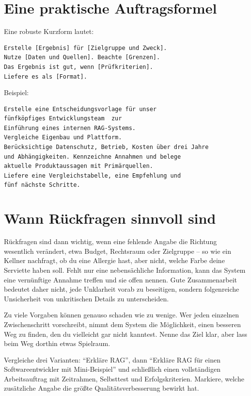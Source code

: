 \section{Eine praktische Auftragsformel}

Eine robuste Kurzform lautet:

\begin{lstlisting}
Erstelle [Ergebnis] für [Zielgruppe und Zweck].
Nutze [Daten und Quellen]. Beachte [Grenzen].
Das Ergebnis ist gut, wenn [Prüfkriterien].
Liefere es als [Format].
\end{lstlisting}

Beispiel:

\begin{lstlisting}
Erstelle eine Entscheidungsvorlage für unser 
fünfköpfiges Entwicklungsteam  zur 
Einführung eines internen RAG-Systems. 
Vergleiche Eigenbau und Plattform.
Berücksichtige Datenschutz, Betrieb, Kosten über drei Jahre 
und Abhängigkeiten. Kennzeichne Annahmen und belege 
aktuelle Produktaussagen mit Primärquellen.
Liefere eine Vergleichstabelle, eine Empfehlung und 
fünf nächste Schritte.
\end{lstlisting}

\section{Wann Rückfragen sinnvoll sind}

Rückfragen sind dann wichtig, wenn eine fehlende Angabe die Richtung wesentlich verändert, etwa Budget, Rechtsraum oder Zielgruppe -- so wie ein Kellner nachfragt, ob du eine Allergie hast, aber nicht, welche Farbe deine Serviette haben soll. Fehlt nur eine nebensächliche Information, kann das System eine vernünftige Annahme treffen und sie offen nennen. Gute Zusammenarbeit bedeutet daher nicht, jede Unklarheit vorab zu beseitigen, sondern folgenreiche Unsicherheit von unkritischen Details zu unterscheiden.

\begin{achtung}
Zu viele Vorgaben können genauso schaden wie zu wenige. Wer jeden einzelnen Zwischenschritt vorschreibt, nimmt dem System die Möglichkeit, einen besseren Weg zu finden, den du vielleicht gar nicht kanntest. Nenne das Ziel klar, aber lass beim Weg dorthin etwas Spielraum.
\end{achtung}

\begin{praxis}
Vergleiche drei Varianten: ``Erkläre RAG'', dann ``Erkläre RAG für einen Softwareentwickler mit Mini-Beispiel'' und schließlich einen vollständigen Arbeitsauftrag mit Zeitrahmen, Selbsttest und Erfolgskriterien. Markiere, welche zusätzliche Angabe die größte Qualitätsverbesserung bewirkt hat.
\end{praxis}
